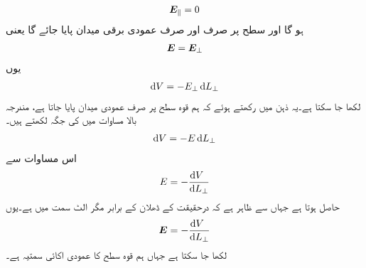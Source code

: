 \begin{align}
{\ensuremath{{\boldsymbol{E}}}}_\parallel=0
\end{align}
ہو گا اور سطح پر صرف اور صرف عمودی برقی میدان پایا جائے گا یعنی
\begin{align}
{\ensuremath{{\boldsymbol{E}}}}={{\boldsymbol{E}}}_\perp
\end{align}
یوں
\begin{align}
\dif V=-E_\perp \dif L_\perp
\end{align}  
لکھا جا سکتا ہے۔یہ ذہن میں رکھتے ہوئے کہ ہم قوہ سطح پر صرف عمودی میدان پایا جاتا ہے، مندرجہ بالا مساوات میں  کی جگہ  لکھتے ہیں۔
\begin{align}
\dif V=-E \dif L_\perp
\end{align}
اس مساوات سے
\begin{align}
E=-\frac{\dif V_{\phantom{\perp}}}{\dif L_\perp}
\end{align}
حاصل ہوتا ہے جہاں سے ظاہر ہے کہ  درحقیقت  کے ڈھلان کے برابر مگر الٹ سمت میں ہے۔یوں
\begin{align}
\kvec{E}=-\frac{\dif V_{\phantom{\perp}}}{\dif L_\perp} 
\end{align}
لکھا جا سکتا ہے جہاں  ہم قوہ سطح کا عمودی اکائی سمتیہ ہے۔

